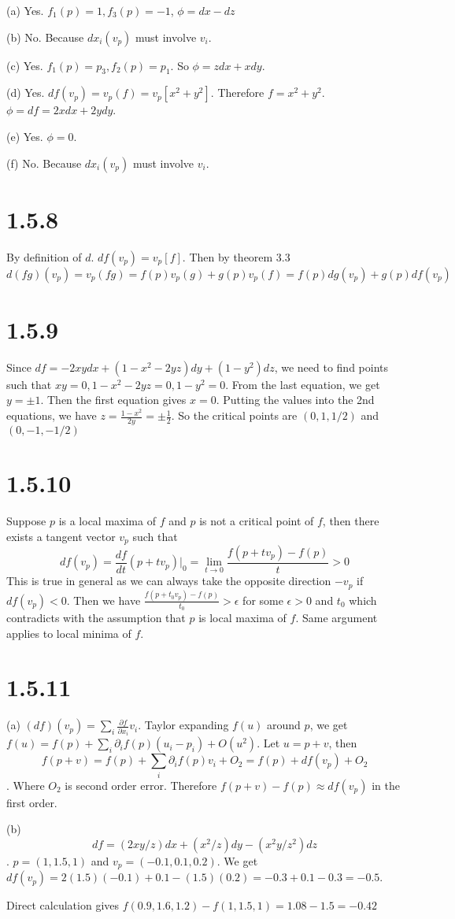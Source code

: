 \documentclass[12pt]{article}
\begin{document}
(a) Yes. $f_1(p) = 1, f_3(p) = -1$,  $\phi = dx - dz$

(b) No.  Because $dx_i(v_p)$ must involve $v_i$.

(c) Yes. $f_1(p) = p_3, f_2(p) = p_1$. So $\phi = zdx + xdy$.

(d) Yes. $df(v_p) = v_p(f) = v_p[x^2+y^2]$. Therefore $f = x^2+y^2$.  $\phi = df = 2xdx + 2ydy$.

(e) Yes. $\phi = 0$.

(f) No. Because $dx_i(v_p)$ must involve $v_i$.

\section*{1.5.8}
By definition of $d$. $df(v_p) = v_p[f]$. Then by theorem 3.3
$$ d(fg)(v_p) = v_p(fg) = f(p)v_p(g) + g(p) v_p(f) = f(p)dg(v_p) + g(p) df(v_p)$$

\section*{1.5.9}
Since $df = -2xydx + (1-x^2-2yz)dy + (1-y^2)dz$,  we need to find points such that $xy =0,  1-x^2-2yz =0, 1-y^2= 0$. From the last equation, we get $y=\pm 1$. Then the first equation gives $x=0$. Putting the values into the 2nd equations, we have $z = \frac{1-x^2}{2y} = \pm \frac{1}{2}$. So the critical points are $(0, 1, 1/2)$ and $(0, -1, -1/2)$

\section*{1.5.10}
Suppose $p$ is a local maxima of $f$ and $p$ is not a critical point of $f$, then there exists a tangent vector $v_p$ such that $$df(v_p) = \frac{df}{dt}(p+tv_p)\bigg|_0 = \lim_{t \rightarrow 0} \frac{f(p+tv_p) - f(p)}{t} > 0$$
This is true in general as we can always take the opposite direction $-v_p$ if $df(v_p) < 0$. Then we have $\frac{f(p+t_0v_p) - f(p)}{t_0} > \epsilon$ for some $\epsilon>0$ and $t_0$ which contradicts with the assumption that $p$ is local maxima of $f$. Same argument applies to local minima of $f$. \QED

\section*{1.5.11}
(a)
$(df)(v_p) = \sum_i \frac{\partial f}{\partial x_i} v_i$.  Taylor expanding $f(u)$ around $p$, we get $f(u) = f(p) + \sum_i \partial_i f (p)(u_i - p_i) + O(u^2)$. Let $u=p+v$, then $$f(p+v) = f(p) + \sum_i \partial_i f (p)v_i + O_2 = f(p) + df(v_p) + O_2$$.
Where $O_2$ is second order error. Therefore $f(p+v) - f(p) \approx df(v_p)$ in the first order. \QED

(b) $$df = (2xy/z) dx + (x^2/z) dy - (x^2y/z^2)dz$$. $p = (1,1.5,1)$ and $v_p=(-0.1, 0.1, 0.2)$.
We get $df(v_p) = 2(1.5)(-0.1) +0.1 - (1.5)(0.2) =-0.3 + 0.1 - 0.3 = -0.5$. 

Direct calculation gives $f(0.9, 1.6, 1.2) - f(1, 1.5, 1) = 1.08 - 1.5 = -0.42$
\end{document}
